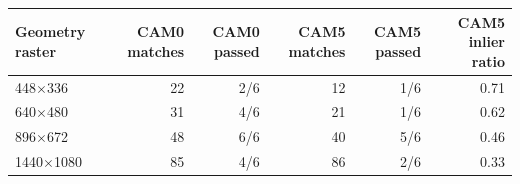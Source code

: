 \begin{tabularx}{\textwidth}{@{}lrrrrr@{}}
\toprule
Geometry raster & CAM0 matches & CAM0 passed & CAM5 matches & CAM5 passed & CAM5 inlier ratio \\
\midrule
448$\times$336 & 22 & 2/6 & 12 & 1/6 & 0.71 \\
640$\times$480 & 31 & 4/6 & 21 & 1/6 & 0.62 \\
896$\times$672 & 48 & 6/6 & 40 & 5/6 & 0.46 \\
1440$\times$1080 & 85 & 4/6 & 86 & 2/6 & 0.33 \\
\bottomrule
\end{tabularx}